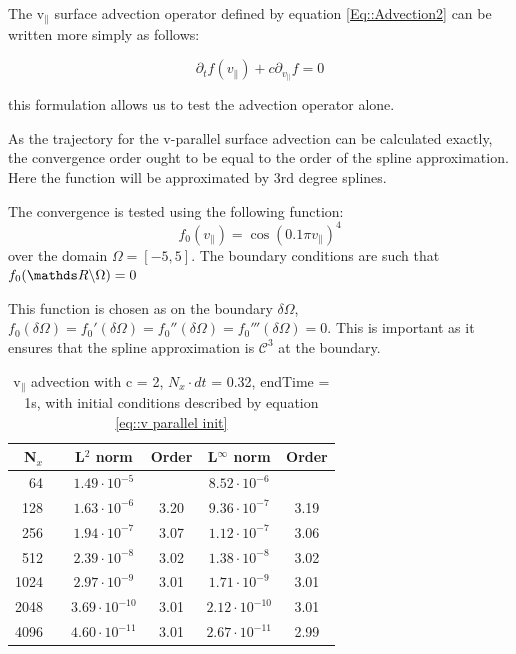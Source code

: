The v$_\parallel$ surface advection operator defined by equation \ref{Eq::Advection2} can be written more simply as follows:

\begin{equation}
 \partial_t f(v_\parallel) + c \partial_{v_\parallel}f = 0
\end{equation}

this formulation allows us to test the advection operator alone.

As the trajectory for the v-parallel surface advection can be calculated exactly, the convergence order ought to be equal to the order of the spline approximation. Here the function will be approximated by 3rd degree splines.

The convergence is tested using the following function:
\begin{equation}\label{eq::v parallel init}
 f_0(v_\parallel) = \cos(0.1 \pi v_\parallel)^4
\end{equation}
over the domain $\Omega=[-5,5]$. The boundary conditions are such that $f_0(\reel\backslash\Omega)=0$

This function is chosen as on the boundary $\delta\Omega$, $f_0(\delta\Omega)=f_0'(\delta\Omega)=f_0''(\delta\Omega)=f_0'''(\delta\Omega)=0$. This is important as it ensures that the spline approximation is $\mathcal{C}^3$ at the boundary.

\begin{table}[ht]
\centering
 \begin{tabular}{|r c|c|c|c|c|}
  \hline
  \bf N$_x$ & & \bf L$^2$ norm       & \bf Order & \bf L$^\infty$ norm  & \bf Order\\
  \hline
  64     & & $ 1.49 \cdot 10^{ -5 }$ &       & $ 8.52 \cdot 10^{ -6 }$ &  \\
  \hline
  128     & & $ 1.63 \cdot 10^{ -6 }$ &  3.20  & $ 9.36 \cdot 10^{ -7 }$ &  3.19  \\
  \hline
  256     & & $ 1.94 \cdot 10^{ -7 }$ &  3.07  & $ 1.12 \cdot 10^{ -7 }$ &  3.06  \\
  \hline
  512     & & $ 2.39 \cdot 10^{ -8 }$ &  3.02  & $ 1.38 \cdot 10^{ -8 }$ &  3.02  \\
  \hline
  1024     & & $ 2.97 \cdot 10^{ -9 }$ &  3.01  & $ 1.71 \cdot 10^{ -9 }$ &  3.01  \\
  \hline
  2048     & & $ 3.69 \cdot 10^{ -10 }$ &  3.01  & $ 2.12 \cdot 10^{ -10 }$ &  3.01  \\
  \hline
  4096     & & $ 4.60 \cdot 10^{ -11 }$ &  3.01  & $ 2.67 \cdot 10^{ -11 }$ &  2.99  \\
  \hline
 \end{tabular}
 \caption{\label{V Parallel convergence} v$_\parallel$ advection with c = 2, $N_x\cdot dt$ = 0.32, endTime = 1s, with initial conditions described by equation \ref{eq::v parallel init}}
\end{table}

